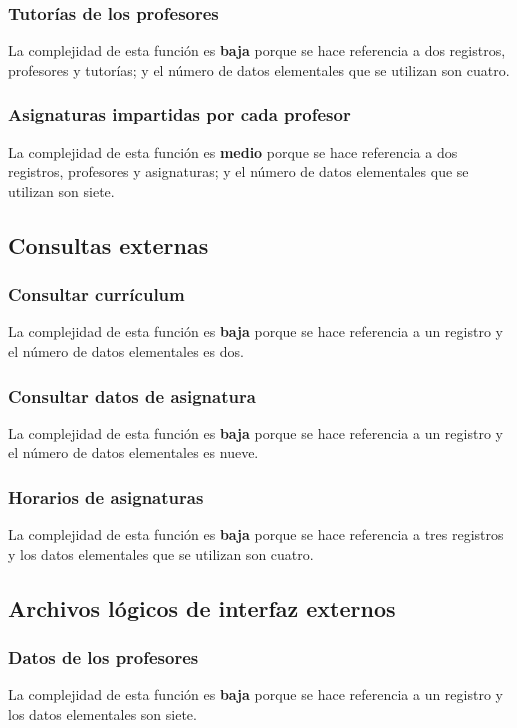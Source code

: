 \documentclass[11pt,a4paper,spanish,twoside]{book}
\begin{document}
\subsubsection{Tutorías de los profesores} 
La complejidad de esta función es \textbf{baja} porque se hace referencia a
dos registros, profesores y tutorías; y el número de datos elementales que se
utilizan son cuatro. 

\subsubsection{Asignaturas impartidas por cada profesor}
La complejidad de esta función es \textbf{medio} porque se hace referencia a
dos registros, profesores y asignaturas; y el número de datos elementales que se
utilizan son siete. 

\subsection{Consultas externas}
\subsubsection{Consultar currículum}
La complejidad de esta función es \textbf{baja} porque se hace referencia a
un registro y el número de datos elementales es dos.

\subsubsection{Consultar datos de asignatura} 
La complejidad de esta función es \textbf{baja} porque se hace referencia a
un registro y el número de datos elementales es nueve.

\subsubsection{Horarios de asignaturas}
La complejidad de esta función es \textbf{baja} porque se hace referencia a
tres registros y los datos elementales que se utilizan son cuatro.

\subsection{Archivos lógicos de interfaz externos}
\subsubsection{Datos de los profesores}
La complejidad de esta función es \textbf{baja} porque se hace referencia a
un registro y los datos elementales son siete.
\end{document}
